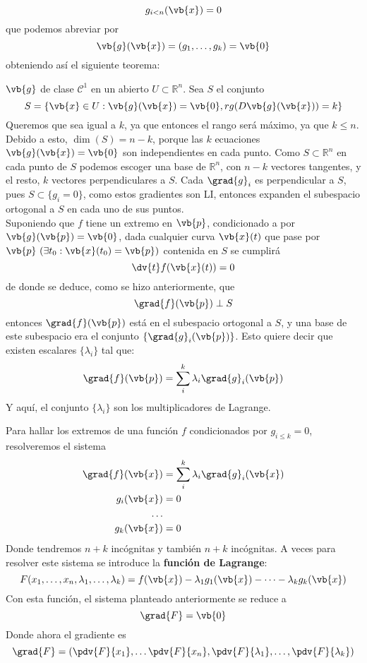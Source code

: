 \documentclass{../Calculo.tex}
\begin{document}
\[
	g_{i<n}(\vb{x}) = 0
\]
que podemos abreviar por
\[
	\vb{g}(\vb{x}) = (g_1,\dots ,g_{k}) = \vb{0}
\]
obteniendo así el siguiente teorema:
\begin{teorema}
$\vb{g}$ de clase $\mathcal{C}^{1}$ en un abierto $U \subset \mathbb{R}^{n}$. Sea $S$ el conjunto  
\[
	S = \{ \vb{x} \in U : \vb{g}(\vb{x}) = \vb{0}, rg(D\vb{g}(\vb{x})) = k\}
\]
Queremos que sea igual a $k$, ya que entonces el rango será máximo, ya que $k \leq n$. Debido a esto, $\dim (S) = n-k$, porque las $k$ ecuaciones $\vb{g}(\vb{x}) = \vb{0}$ son independientes en cada punto. Como $S \subset \mathbb{R}^{n}$ en cada punto de $S$ podemos escoger una base de $\mathbb{R}^{n}$, con $n-k$ vectores tangentes, y el resto, $k$ vectores perpendiculares a $S$. Cada $\grad{g}_{i}$ es perpendicular a $S$, pues $S \subset \{ g_{i}=0 \}$, como estos gradientes son LI, entonces expanden el subespacio ortogonal a $S$ en cada uno de sus puntos.\\
Suponiendo que $f$ tiene un extremo en $\vb{p}$, condicionado a por $\vb{g}(\vb{p}) = \vb{0}$, dada cualquier curva $\vb{x}(t)$  que pase por $\vb{p}~(\exists t_0 : \vb{x}(t_0) = \vb{p})$ contenida en $S$ se cumplirá
\[
	\dv{t}f(\vb{x}(t)) = 0
\]
de donde se deduce, como se hizo anteriormente, que
\[
	\grad{f}(\vb{p}) \perp S
\]
entonces $\grad{f}(\vb{p})$ está en el subespacio ortogonal a $S$, y una base de este subespacio era el conjunto $\{ \grad{g}_{i}(\vb{p}) \}$. Esto quiere decir que existen escalares $\{ \lambda_{i} \}$ tal que:
\[
	\grad{f}(\vb{p}) = \sum_{i}^{k} \lambda_{i} \grad{g}_{i}(\vb{p})
\]
Y aquí, el conjunto $\{ \lambda_{i} \}$ son los multiplicadores de Lagrange. 
\end{teorema}
Para hallar los extremos de una función $f$ condicionados por $g_{i\leq k} = 0$, resolveremos el sistema
\[
\]
\begin{equation}
	\begin{split}
		\grad{f}(\vb{x}) &= \sum_{i}^{k} \lambda_{i} \grad{g}_{i}(\vb{x})\\
		g_{i}(\vb{x}) &= 0\\
		\dots& \\
		g_{k}(\vb{x}) &= 0
	\end{split}
\end{equation}
Donde tendremos $n+k$ incógnitas y también $n+k$ incógnitas. A veces para resolver este sistema se introduce la \textbf{función de Lagrange}:
\[
	F(x_1,\dots ,x_{n}, \lambda_1,\dots ,\lambda_{k}) =
	f(\vb{x})-\lambda_1g_{1}(\vb{x})-\dots -\lambda_{k}g_{k}(\vb{x})
\]
Con esta función, el sistema planteado anteriormente se reduce a
\[
	\grad{F} = \vb{0}
\]
Donde ahora el gradiente es
\[
	\grad{F} = (\pdv{F}{x_1},\dots \pdv{F}{x_{n}},\pdv{F}{\lambda_1},\dots ,\pdv{F}{\lambda_{k}})
\]
\end{document}
